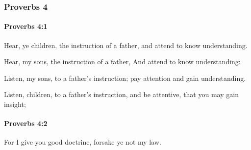 	\subsubsection{Proverbs 4} %
		\label{PROVERBS-4}

		\paragraph{Proverbs 4:1} %
			\label{PROVERBS-4-1}

			Hear, ye children, the instruction of a father, and attend to know understanding.

			\begin{versebox}
					\item[BHS] 
					\item[ASV] Hear, my sons, the instruction of a father, And attend to know understanding:
					\item[NIV] Listen, my sons, to a father’s instruction; pay attention and gain understanding.
					\item[NRSV] Listen, children, to a father’s instruction, and be attentive, that you may gain insight;
			\end{versebox}

		\paragraph{Proverbs 4:2} %
			\label{PROVERBS-4-2}

			For I give you good doctrine, forsake ye not my law.

